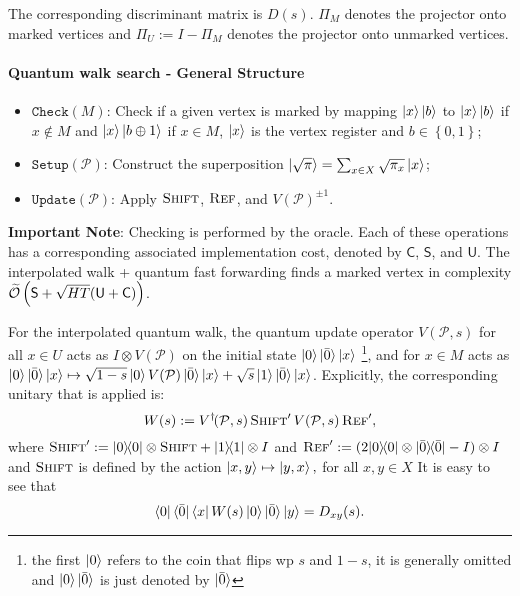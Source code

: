 \documentclass{article}
\newcommand{\ketbra}[2]{|#1\rangle\! \langle #2|}
\newcommand{\bigOt}[1]{\widetilde{\mathcal{O}}\left( #1 \right)}
\newcommand{\PM}{\mathcal{P}}
\newcommand\lrb[1]{\left\lbrace #1 \right\rbrace}
\renewcommand{\check}{\mathtt{Check}}
\newcommand{\setup}{\mathtt{Setup}}
\newcommand{\update}{\mathtt{Update}}
\newcommand{\checkingcost}{\mathsf{C}}
\newcommand{\setupcost}{\mathsf{S}}
\newcommand{\updatecost}{\mathsf{U}}
\newcommand{\barO}{\bar{0}}
\begin{document}
The corresponding discriminant matrix is $D(s)$. $\Pi_M$ denotes the projector onto marked vertices and $\Pi_U:=I-\Pi_M$ denotes the projector onto unmarked vertices. 

\paragraph{Quantum walk search - General Structure}

\begin{itemize}
	\item $\check(M)$: Check if a given vertex is marked
	by mapping $\ket{x} \ket{b}$ to $\ket{x} \ket{b}$ if $x \notin M$ and $\ket{x} \ket{b \oplus 1}$ if $x \in M$, $\ket{x}$ is the vertex register and $b \in \lrb{0,1}$;
	\item $\setup(\PM )$: Construct the superposition $\ket{\sqrt \pi}  = \sum_{x \in X} \sqrt{\pi_x} \ket{x}$;
	\item $\update(\PM)$: Apply $\textsc{Shift}$, $\textsc{Ref}$, and $V(\PM)^{\pm1}$.
\end{itemize}

\textbf{Important Note}: Checking is performed by the oracle. Each of these operations has a corresponding associated implementation cost, denoted by $\checkingcost$, $\setupcost$, and $\updatecost$. 
The interpolated walk + quantum fast forwarding finds a marked vertex in complexity $\bigOt{{\sf S}+\sqrt{HT}({\sf U}+{\sf C})}$.

For the interpolated quantum walk, the quantum update operator $V(\PM,s)$ for all $x\in U$ acts as $I\otimes V(\PM)$ on the initial state $\ket{0}\ket{\barO}\ket{x}$ \footnote{the first $\ket{0}$ refers to the coin that flips wp $s$ and $1-s$, it is generally omitted and $\ket{0}\ket{\barO}$ is just denoted by $\ket{\barO}$}, and for $x\in M$ acts as $\ket{0}\ket{\barO}\ket{x}\mapsto \sqrt{1-s}\ket{0}V(\PM)\ket{\barO}\ket{x} + \sqrt{s}\ket{1}\ket{\barO}\ket{x}$. Explicitly, the corresponding unitary that is applied is:
\begin{equation}
W(s):=V^\dagger\!(\PM,s) \,\textsc{Shift}'\, V(\PM,s)\, \textsc{Ref}',
\end{equation}
where $\textsc{Shift}':=\ketbra{0}{0}\otimes\textsc{Shift}+\ketbra{1}{1}\otimes I$ and $\textsc{Ref}':=(2\ketbra{0}{0}\otimes\ketbra{\barO}{\barO}-I)\otimes I$ and $\textsc{Shift}$ is defined by the action $\ket{x,y}\mapsto\ket{y,x},$
for all $x,y\in X$
It is easy to see that
 \begin{equation}\label{eq:blockWalk}
 \bra{0}\bra{\barO}\bra{x}W(s)\ket{0}\ket{\barO}\ket{y}=D_{xy}(s).
 \end{equation}
 
\end{document}
